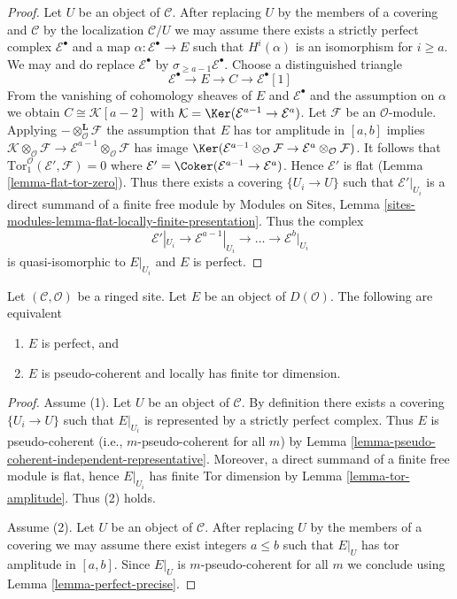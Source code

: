 \begin{proof}
Let $U$ be an object of $\mathcal{C}$. After replacing $U$ by the members
of a covering and $\mathcal{C}$ by the localization $\mathcal{C}/U$
we may assume there exists a strictly perfect complex $\mathcal{E}^\bullet$
and a map $\alpha : \mathcal{E}^\bullet \to E$ such that $H^i(\alpha)$ is
an isomorphism for $i \geq a$. We may and do replace
$\mathcal{E}^\bullet$ by $\sigma_{\geq a - 1}\mathcal{E}^\bullet$. Choose a
distinguished triangle
$$
\mathcal{E}^\bullet \to E \to C \to \mathcal{E}^\bullet[1]
$$
From the vanishing of cohomology sheaves of $E$ and $\mathcal{E}^\bullet$
and the assumption on $\alpha$ we obtain $C \cong \mathcal{K}[a - 2]$ with
$\mathcal{K} = \Ker(\mathcal{E}^{a - 1} \to \mathcal{E}^a)$.
Let $\mathcal{F}$ be an $\mathcal{O}$-module.
Applying $- \otimes_\mathcal{O}^\mathbf{L} \mathcal{F}$
the assumption that $E$ has tor amplitude in $[a, b]$
implies $\mathcal{K} \otimes_\mathcal{O} \mathcal{F} \to
\mathcal{E}^{a - 1} \otimes_\mathcal{O} \mathcal{F}$ has image
$\Ker(\mathcal{E}^{a - 1} \otimes_\mathcal{O} \mathcal{F}
\to \mathcal{E}^a \otimes_\mathcal{O} \mathcal{F})$.
It follows that $\text{Tor}_1^\mathcal{O}(\mathcal{E}', \mathcal{F}) = 0$
where $\mathcal{E}' = \Coker(\mathcal{E}^{a - 1} \to \mathcal{E}^a)$.
Hence $\mathcal{E}'$ is flat (Lemma \ref{lemma-flat-tor-zero}).
Thus there exists a covering $\{U_i \to U\}$ such that
$\mathcal{E}'|_{U_i}$ is a direct summand of a finite free module by
Modules on Sites, Lemma
\ref{sites-modules-lemma-flat-locally-finite-presentation}.
Thus the complex
$$
\mathcal{E}'|_{U_i} \to \mathcal{E}^{a - 1}|_{U_i} \to \ldots \to
\mathcal{E}^b|_{U_i}
$$
is quasi-isomorphic to $E|_{U_i}$ and $E$ is perfect.
\end{proof}

\begin{lemma}
\label{lemma-perfect}
Let $(\mathcal{C}, \mathcal{O})$ be a ringed site.
Let $E$ be an object of $D(\mathcal{O})$.
The following are equivalent
\begin{enumerate}
\item $E$ is perfect, and
\item $E$ is pseudo-coherent and locally has finite tor dimension.
\end{enumerate}
\end{lemma}

\begin{proof}
Assume (1). Let $U$ be an object of $\mathcal{C}$.
By definition there exists a covering $\{U_i \to U\}$ such that
$E|_{U_i}$ is represented by a strictly perfect complex.
Thus $E$ is pseudo-coherent (i.e., $m$-pseudo-coherent for all $m$) by
Lemma \ref{lemma-pseudo-coherent-independent-representative}.
Moreover, a direct summand of a finite free module is flat, hence
$E|_{U_i}$ has finite Tor dimension by
Lemma \ref{lemma-tor-amplitude}. Thus (2) holds.

\medskip\noindent
Assume (2). Let $U$ be an object of $\mathcal{C}$.
After replacing $U$ by the members of a covering
we may assume there exist integers $a \leq b$ such that $E|_U$
has tor amplitude in $[a, b]$. Since $E|_U$ is $m$-pseudo-coherent
for all $m$ we conclude using Lemma \ref{lemma-perfect-precise}.
\end{proof}

